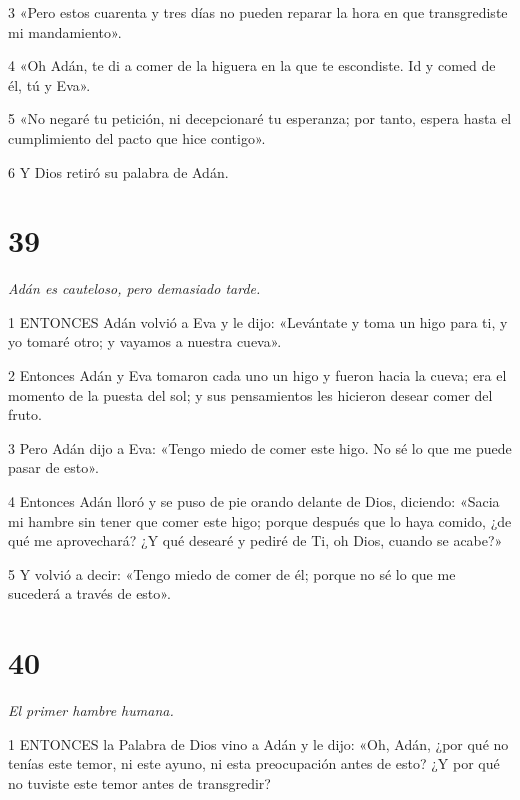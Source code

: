 \par 3 «Pero estos cuarenta y tres días no pueden reparar la hora en que transgrediste mi mandamiento».

\par 4 «Oh Adán, te di a comer de la higuera en la que te escondiste. Id y comed de él, tú y Eva».

\par 5 «No negaré tu petición, ni decepcionaré tu esperanza; por tanto, espera hasta el cumplimiento del pacto que hice contigo».

\par 6 Y Dios retiró su palabra de Adán.

\chapter{39}

\par \textit{Adán es cauteloso, pero demasiado tarde.}

\par 1 ENTONCES Adán volvió a Eva y le dijo: «Levántate y toma un higo para ti, y yo tomaré otro; y vayamos a nuestra cueva».

\par 2 Entonces Adán y Eva tomaron cada uno un higo y fueron hacia la cueva; era el momento de la puesta del sol; y sus pensamientos les hicieron desear comer del fruto.

\par 3 Pero Adán dijo a Eva: «Tengo miedo de comer este higo. No sé lo que me puede pasar de esto».

\par 4 Entonces Adán lloró y se puso de pie orando delante de Dios, diciendo: «Sacia mi hambre sin tener que comer este higo; porque después que lo haya comido, ¿de qué me aprovechará? ¿Y qué desearé y pediré de Ti, oh Dios, cuando se acabe?»

\par 5 Y volvió a decir: «Tengo miedo de comer de él; porque no sé lo que me sucederá a través de esto».

\chapter{40}

\par \textit{El primer hambre humana.}

\par 1 ENTONCES la Palabra de Dios vino a Adán y le dijo: «Oh, Adán, ¿por qué no tenías este temor, ni este ayuno, ni esta preocupación antes de esto? ¿Y por qué no tuviste este temor antes de transgredir?

